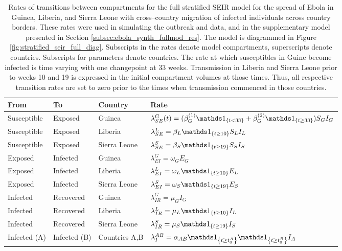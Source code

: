 \begin{table}
	\caption[Transmission rates for the stratified SEIR model with migration of infecteds for Ebola in West Africa.]{Rates of transitions between compartments for the full stratified SEIR model for the spread of Ebola in Guinea, Liberia, and Sierra Leone with cross--country migration of infected individuals across country borders. These rates were used in simulating the outbreak and data, and in the supplementary model presented in Section \ref{subsec:ebola_synth_fullmod_res}. The model is diagrammed in Figure \ref{fig:stratified_seir_full_diag}. Subscripts in the rates denote model compartments, superscripts denote countries. Subscripts for parameters denote countries. The rate at which susceptibles in Guine become infected is time varying with one changepoint at 33 weeks. Transmission in Liberia and Sierra Leone prior to weeks 10 and 19 is expressed in the initial compartment volumes at those times. Thus, all respective transition rates are set to zero prior to the times when transmission commenced in those countries.}
	\label{tab:ebola_synth_rates_full}
	\centering\footnotesize
	\begin{tabular}{llll}
		\hline
		\textbf{From} & \textbf{To} & \textbf{Country} & \textbf{Rate} \\
		\hline
		Susceptible & Exposed & Guinea & $ \lambda_{SE}^G(t) = (\beta_G^{(1)} \ind{t<33} + \beta_G^{(2)}\ind{t\geq33})S_GI_G $ \\
		Susceptible & Exposed & Liberia & $ \lambda_{SE}^L = \beta_L\ind{t\geq10}S_LI_L $\\
		Susceptible & Exposed & Sierra Leone & $ \lambda_{SE}^S = \beta_S\ind{t\geq19}S_SI_S $ \\
		Exposed & Infected & Guinea & $ \lambda_{EI}^G = \omega_GE_G $\\
		Exposed & Infected & Liberia & $ \lambda_{EI}^L = \omega_L\ind{t\geq10}E_L $ \\
		Exposed & Infected & Sierra Leone & $\lambda_{EI}^S = \omega_S\ind{t\geq19}E_S$ \\
		Infected & Recovered & Guinea & $ \lambda_{IR}^G = \mu_GI_G $ \\
		Infected & Recovered & Liberia & $ \lambda_{IR}^L = \mu_L\ind{t\geq10}I_L $ \\	
		Infected & Recovered & Sierra Leone & $ \lambda_{IR}^S = \mu_S\ind{t\geq19}I_S $ \\
		Infected (A) & Infected (B) & Countries A,B & $ \lambda_I ^{AB} = \alpha_{AB}\ind{t\geq{t_{0}^A}}\ind{t\geq t_{0}^B}I_A$\\
		\hline
	\end{tabular}
\end{table}

